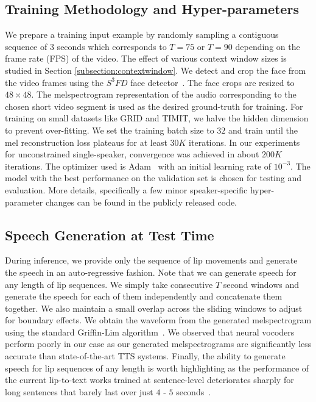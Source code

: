 \documentclass[10pt,twocolumn,letterpaper]{article}
\begin{document}
\subsection{Training Methodology and Hyper-parameters}
\label{subsection:hparams}
We prepare a training input example by randomly sampling a contiguous sequence of $3$ seconds which corresponds to $T=75$ or $T=90$ depending on the frame rate (FPS) of the video. The effect of various context window sizes is studied in Section \ref{subsection:contextwindow}. We detect and crop the face from the video frames using the $S^3FD$ face detector~\cite{zhang2017s3fd}. The face crops are resized to $48 \times 48$. The melspectrogram representation of the audio corresponding to the chosen short video segment is used as the desired ground-truth for training. For training on small datasets like GRID and TIMIT, we halve the hidden dimension to prevent over-fitting. We set the training batch size to $32$ and train until the mel reconstruction loss plateaus for at least $30K$ iterations. In our experiments for unconstrained single-speaker, convergence was achieved in about $200K$ iterations. The optimizer used is Adam~\cite{kingma2014adam} with an initial learning rate of $10^{-3}$. The model with the best performance on the validation set is chosen for testing and evaluation. More details, specifically a few minor speaker-specific hyper-parameter changes can be found in the publicly released code\footnotemark[2].

\subsection{Speech Generation at Test Time}
During inference, we provide only the sequence of lip movements and generate the speech in an auto-regressive fashion. Note that we can generate speech for any length of lip sequences. We simply take consecutive $T$ second windows and generate the speech for each of them independently and concatenate them together. We also maintain a small overlap across the sliding windows to adjust for boundary effects. We obtain the waveform from the generated melspectrogram using the standard Griffin-Lim algorithm~\cite{Griffin1983SignalEF}. We observed that neural vocoders~\cite{Oord2016WaveNetAG} perform poorly in our case as our generated melspectrograms are significantly less accurate than state-of-the-art TTS systems. Finally, the ability to generate speech for lip sequences of any length is worth highlighting as the performance of the current lip-to-text works trained at sentence-level deteriorates sharply for long sentences that barely last over just $4$ - $5$ seconds~\cite{Afouras2018DeepLR}. 
\end{document}

